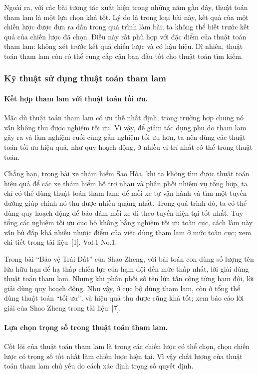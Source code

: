 \documentclass[11pt]{article}
\begin{document}
Ngoài ra, với các bài tương tác xuất hiện trong những năm gần đây, thuật toán
tham lam là một lựa chọn khá tốt. Lý do là trong loại bài này, kết quả của một
chiến lược được đưa ra dần trong quá trình làm bài; ta không thể biết trước
kết quả của chiến lược đã chọn. Điều này rất phù hợp với đặc điểm của thuật
toán tham lam: không xét trước kết quả chiến lược và có hậu hiệu. Dĩ nhiên,
thuật toán tham lam còn có thể cung cấp cận ban đầu tốt cho thuật toán tìm
kiếm.

\subsubsection{Kỹ thuật sử dụng thuật toán tham lam}

\paragraph{Kết hợp tham lam với thuật toán tối ưu.}
Mặc dù thuật toán tham lam có ưu thế nhất định, trong trường hợp chung nó vẫn
không thu được nghiệm tối ưu. Vì vậy, để giảm tác dụng phụ do tham lam gây ra
và làm nghiệm cuối cùng gần nghiệm tối ưu hơn, ta nên dùng các thuật toán tối
ưu hiệu quả, như quy hoạch động, ở nhiều vị trí nhất có thể trong thuật toán.

Chẳng hạn, trong bài xe thám hiểm Sao Hỏa, khi ta không tìm được thuật toán
hiệu quả để các xe thám hiểm hỗ trợ nhau và phân phối nhiệm vụ tổng hợp, ta
chỉ có thể dùng thuật toán tham lam: để mỗi xe tự vận hành và tìm một tuyến
đường giúp chính nó thu được nhiều quặng nhất. Trong quá trình đó, ta có thể
dùng quy hoạch động để bảo đảm mỗi xe đi theo tuyến hiện tại tốt nhất. Tuy
tổng các nghiệm tối ưu cục bộ không bằng nghiệm tối ưu toàn cục, cách làm này
vẫn bù đắp khá nhiều nhược điểm của việc dùng tham lam ở mức toàn cục; xem
chi tiết trong tài liệu~[1], Vol.1 No.1.

Trong bài ``Bảo vệ Trái Đất'' của Shao Zheng, với bài toán con dùng số lượng
tên lửa hữu hạn để hạ thấp chiến lực của hạm đội đến mức thấp nhất, lời giải
dùng thuật toán tham lam. Nhưng khi phân phối số tên lửa tấn công từng hạm
đội, lời giải dùng quy hoạch động. Như vậy, ở cục bộ dùng tham lam, còn ở
tổng thể dùng thuật toán ``tối ưu'', và hiệu quả thu được cũng khá tốt; xem
báo cáo lời giải của Shao Zheng trong tài liệu~[7].

\paragraph{Lựa chọn trọng số trong thuật toán tham lam.}
Cốt lõi của thuật toán tham lam là trong các chiến lược có thể chọn, chọn
chiến lược có trọng số tốt nhất làm chiến lược hiện tại. Vì vậy chất lượng của
thuật toán tham lam chủ yếu do cách xác định trọng số quyết định.
\end{document}
